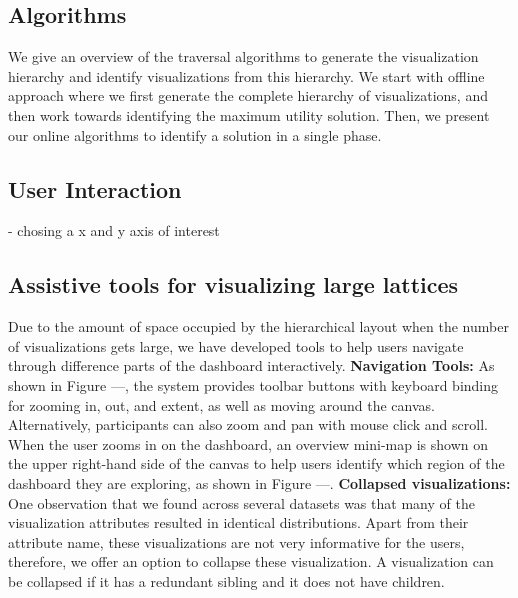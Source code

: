 \subsection{Algorithms}
We give an overview of the traversal algorithms to generate the visualization hierarchy and identify visualizations from this hierarchy. We start with offline approach where we first generate the complete hierarchy of visualizations, and then work towards identifying the maximum utility solution. Then, we present our online algorithms to identify a solution in a single phase. 


\subsection{User Interaction}
- chosing a x and y axis of interest 

\subsection{Assistive tools for visualizing large lattices}
Due to the amount of space occupied by the hierarchical layout when the number of visualizations gets large, we have developed tools to help users navigate through difference parts of the dashboard interactively. 
\textbf{Navigation Tools:} As shown in Figure ---, the system provides toolbar buttons with keyboard binding for zooming in, out, and extent, as well as moving around the canvas. Alternatively, participants can also zoom and pan with mouse click and scroll. When the user zooms in on the dashboard, an overview mini-map is shown on the upper right-hand side of the canvas to help users identify which region of the dashboard they are exploring, as shown in Figure ---. 
\textbf{Collapsed visualizations:} One observation that we found across several datasets was that many of the visualization attributes resulted in identical distributions. Apart from their attribute name, these visualizations are not very informative for the users, therefore, we offer an option to collapse these visualization. A visualization can be collapsed if it has a redundant sibling and it does not have children.
